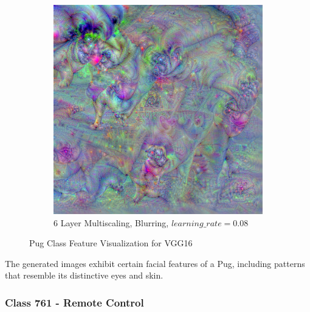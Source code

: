 \begin{figure}
\begin{subfigure}[t]{0.31\textwidth}
    \end{subfigure}
    \hfill
    \begin{subfigure}[t]{0.31\textwidth}
        \captionsetup{justification=centering}
        \centering
        \includegraphics[width=.7\linewidth]{figuras/feat_vis/experiments/classes/cl254/random_image_ci254_lr8e-2_pl6.png}
        \caption{6 Layer Multiscaling, Blurring, \(learning\_rate = 0.08\)}
    \end{subfigure}

    \caption{Pug Class Feature Visualization for VGG16}
    \label{fig:class_pug}
\end{figure}

The generated images exhibit certain facial features of a Pug, including patterns that resemble its distinctive eyes and skin.

\subsubsection{Class 761 - Remote Control}

